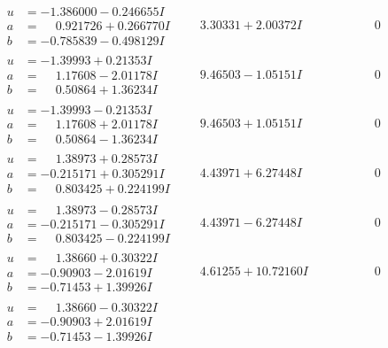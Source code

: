 \documentclass[1p]{elsarticle_modified}
\theoremstyle{definition}
\begin{document}
$$\begin{array}{c|c|c}
\begin{aligned}
u &= -1.386000 - 0.246655 I \\
a &= \phantom{-}0.921726 + 0.266770 I \\
b &= -0.785839 - 0.498129 I\end{aligned}
 & \phantom{-}3.30331 + 2.00372 I & \phantom{-0.000000 } 0 \\ \hline\begin{aligned}
u &= -1.39993 + 0.21353 I \\
a &= \phantom{-}1.17608 - 2.01178 I \\
b &= \phantom{-}0.50864 + 1.36234 I\end{aligned}
 & \phantom{-}9.46503 - 1.05151 I & \phantom{-0.000000 } 0 \\ \hline\begin{aligned}
u &= -1.39993 - 0.21353 I \\
a &= \phantom{-}1.17608 + 2.01178 I \\
b &= \phantom{-}0.50864 - 1.36234 I\end{aligned}
 & \phantom{-}9.46503 + 1.05151 I & \phantom{-0.000000 } 0 \\ \hline\begin{aligned}
u &= \phantom{-}1.38973 + 0.28573 I \\
a &= -0.215171 + 0.305291 I \\
b &= \phantom{-}0.803425 + 0.224199 I\end{aligned}
 & \phantom{-}4.43971 + 6.27448 I & \phantom{-0.000000 } 0 \\ \hline\begin{aligned}
u &= \phantom{-}1.38973 - 0.28573 I \\
a &= -0.215171 - 0.305291 I \\
b &= \phantom{-}0.803425 - 0.224199 I\end{aligned}
 & \phantom{-}4.43971 - 6.27448 I & \phantom{-0.000000 } 0 \\ \hline\begin{aligned}
u &= \phantom{-}1.38660 + 0.30322 I \\
a &= -0.90903 - 2.01619 I \\
b &= -0.71453 + 1.39926 I\end{aligned}
 & \phantom{-}4.61255 + 10.72160 I & \phantom{-0.000000 } 0 \\ \hline\begin{aligned}
u &= \phantom{-}1.38660 - 0.30322 I \\
a &= -0.90903 + 2.01619 I \\
b &= -0.71453 - 1.39926 I\end{aligned}

\end{array}$$
\end{document}
